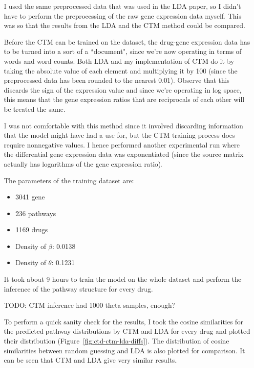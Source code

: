 \documentclass[12pt,a4paper,twoside,openright]{report}
\begin{document}
I used the same preprocessed data that was used in the LDA paper, so I didn't have to perform the preprocessing of the raw gene expression data myself. This was so that the results from the LDA and the CTM method could be compared.

Before the CTM can be trained on the dataset, the drug-gene expression data has to be turned into a sort of a ``document", since we're now operating in terms of words and word counts. Both LDA and my implementation of CTM do it by taking the absolute value of each element and multiplying it by 100 (since the preprocessed data has been rounded to the nearest 0.01). Observe that this discards the sign of the expression value and since we're operating in log space, this means that the gene expression ratios that are reciprocals of each other will be treated the same.

I was not comfortable with this method since it involved discarding information that the model might have had a use for, but the CTM training process does require nonnegative values. I hence performed another experimental run where the differential gene expression data was exponentiated (since the source matrix actually has logarithms of the gene expression ratio).

The parameters of the training dataset are:
\begin{itemize}[noitemsep]
\item 3041 gene
\item 236 pathways
\item 1169 drugs
\item Density of $\beta$: 0.0138
\item Density of $\theta$: 0.1231
\end{itemize}

It took about 9 hours to train the model on the whole dataset and perform the inference of the pathway structure for every drug.

TODO: CTM inference had 1000 theta samples, enough?

To perform a quick sanity check for the results, I took the cosine similarities for the predicted pathway distributions by CTM and LDA for every drug and plotted their distribution (Figure~\ref{fig:ctd-ctm-lda-diffs}). The distribution of cosine similarities between random guessing and LDA is also plotted for comparison. It can be seen that CTM and LDA give very similar results.
\end{document}
